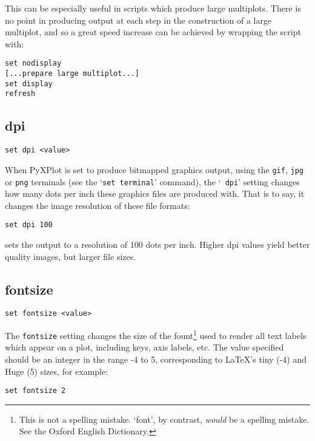 This can be especially useful in scripts which produce large multiplots. There
is no point in producing output at each step in the construction of a large
multiplot, and so a great speed increase can be achieved by wrapping the script
with:

\begin{verbatim}
set nodisplay 
[...prepare large multiplot...] 
set display 
refresh
\end{verbatim}


\subsection{dpi}

\begin{verbatim}
set dpi <value>
\end{verbatim}

When PyXPlot is set to produce bitmapped graphics output, using the {\tt gif},
{\tt jpg} or {\tt png} terminals (see the `{\tt set terminal}' command), the `{\tt
dpi}' setting changes how many dots per inch these graphics files are produced
with. That is to say, it changes the image resolution of these file formats:

\begin{verbatim}
set dpi 100
\end{verbatim}

\noindent sets the output to a resolution of 100 dots per inch. Higher dpi
values yield better quality images, but larger file sizes.

\subsection{fontsize}

\begin{verbatim}
set fontsize <value>
\end{verbatim}

The {\tt fontsize} setting changes the size of the fount\footnote{This is not a
spelling mistake. `font', by contrast, \textit{would} be a spelling mistake. See the
Oxford English Dictionary.} used to render all text labels which appear on a
plot, including keys, axis labels, etc. The value specified should be an integer
in the range -4 to 5, corresponding to \LaTeX's tiny (-4) and Huge (5) sizes,
for example:

\begin{verbatim}
set fontsize 2
\end{verbatim}

